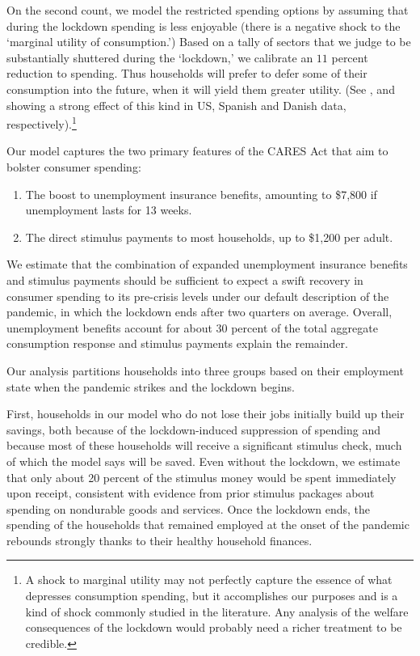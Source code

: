 \documentclass[titlepage,letterpaper]{\econtex}
\begin{document}
On the second count, we model the restricted spending options by assuming that during the lockdown spending is less enjoyable (there is a negative shock to the `marginal utility of consumption.')
Based on a tally of sectors that we judge to be substantially shuttered during the `lockdown,' we calibrate an $11$ percent reduction to spending.
Thus households will prefer to defer some of their consumption into the future, when it will yield them greater utility. (See \cite{covidC_chase}, \cite{SpanishSpending} and \cite{denmark_pandemics} showing a strong effect of this kind in US, Spanish and Danish data, respectively).\footnote{A shock to marginal utility may not perfectly capture the essence of what depresses consumption spending, but it accomplishes our purposes and is a kind of shock commonly studied in the literature.  Any analysis of the welfare consequences of the lockdown would probably need a richer treatment to be credible.}

Our model captures the two primary features of the CARES Act that aim to bolster consumer spending:
\begin{enumerate}
\item The boost to unemployment insurance benefits, amounting to \$7,800 if unemployment lasts for 13 weeks.
\item The direct stimulus payments to most households, up to \$1,200 per adult.
\end{enumerate}

We estimate that the combination of expanded unemployment insurance benefits and stimulus payments should be sufficient to expect a swift recovery in consumer spending to its pre-crisis levels under our default description of the pandemic, in which the lockdown ends after two quarters on average.
Overall, unemployment benefits account for about 30 percent of the total aggregate consumption response and stimulus payments explain the remainder.

Our analysis partitions households into three groups based on their employment state when the pandemic strikes and the lockdown begins.

First, households in our model who do not lose their jobs initially build up their savings, both because of the lockdown-induced suppression of spending and because most of these households will receive a significant stimulus check, much of which the model says will be saved.
Even without the lockdown, we estimate that only about 20 percent of the stimulus money would be spent immediately upon receipt, consistent with evidence from prior stimulus packages about spending on nondurable goods and services.
Once the lockdown ends, the spending of the households that remained employed at the onset of the pandemic rebounds strongly thanks to their healthy household finances.
\end{document}
